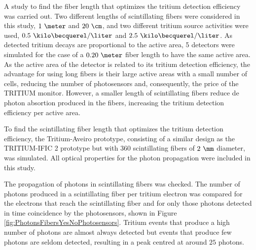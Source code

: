 A study to find the fiber length that optimizes the tritium detection efficiency was carried out. Two different lengths of scintillating fibers were considered in this study, $1~\meter$ and $20~\cm$, and two different tritium source activities were used, $0.5~\kilo\becquerel/\liter$ and $2.5~\kilo\becquerel/\liter$. As detected tritium decays are proportional to the active area, 5 detectors were simulated for the case of a $0.20~\meter$ fiber length to have the same active area. As the active area of the detector is related to its tritium detection efficiency, the advantage for using long fibers is their large active areas with a small number of cells, reducing the number of photosensors and, consequently, the price of the TRITIUM monitor. However, a smaller length of scintillating fibers reduce de photon absortion produced in the fibers, increasing the tritium detection efficiency per active area.

To find the scintillating fiber length that optimizes the tritium detection efficiency, the Tritium-Aveiro prototype, consisting of a similar design as the TRITIUM-IFIC 2 prototype but with $360$ scintillating fibers of $2~\mm$ diameter, was simulated. All optical properties for the photon propagation were included in this study. 

The propagation of photons in scintillating fibers was checked. The number of photons produced in a scintillating fiber per tritium electron was compared for the electrons that reach the scintillating fiber and for only those photons detected in time coincidence by the photosensors, shown in Figure \ref{fig:PhotonsFibersYesNoPhotosensors}. Tritium events that produce a high number of photons are almost always detected but events that produce few photons are seldom detected, resulting in a peak centred at around $25$ photons.  

